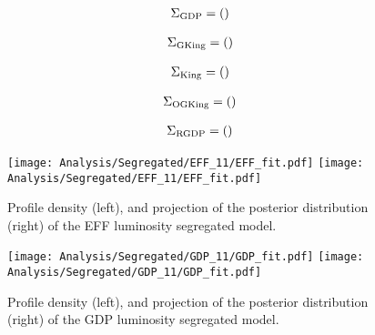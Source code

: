 {\tiny
\begin{multline}
\Sigma_{\rm{GDP}}=
\left(
\arraycolsep=1.5pt
\begin{array}{*{10}r}

\end{array}\right) \nonumber
\end{multline}

\begin{multline}
\Sigma_{\rm{GKing}}=
\left(
\arraycolsep=1.5pt
\begin{array}{*{10}r}

\end{array}\right) \nonumber
\end{multline}



\begin{multline}
\Sigma_{\rm{King}}=
\left(
\arraycolsep=1.5pt
\begin{array}{*{10}r}

\end{array}\right) \nonumber
\end{multline}


\begin{multline}
\Sigma_{\rm{OGKing}}=
\left(
\arraycolsep=1.5pt
\begin{array}{*{10}r}

\end{array}\right)\nonumber
\end{multline}

\begin{multline}
\Sigma_{\rm{RGDP}}=
\left(
\arraycolsep=1.5pt
\begin{array}{*{10}r}

\end{array}\right)\nonumber
\end{multline}
}
   


\begin {figure}
 \centering
 \texttt{[image: Analysis/Segregated/EFF\_11/EFF\_fit.pdf]}
 \texttt{[image: Analysis/Segregated/EFF\_11/EFF\_fit.pdf]}
  \caption{Profile density (left), and projection of the posterior distribution (right) of the EFF luminosity segregated model.}
\label{fig:EFFSeg}
\end {figure}


\begin {figure}
 \centering
 \texttt{[image: Analysis/Segregated/GDP\_11/GDP\_fit.pdf]}
 \texttt{[image: Analysis/Segregated/GDP\_11/GDP\_fit.pdf]}
  \caption{Profile density (left), and projection of the posterior distribution (right) of the GDP luminosity segregated model.}
\label{fig:GDPSeg}
\end {figure}

